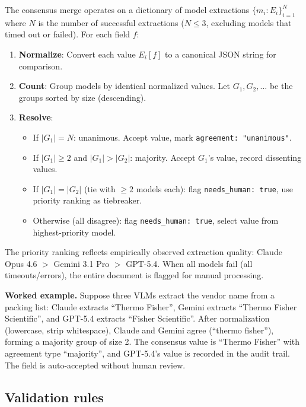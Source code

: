 \documentclass[11pt]{article}
\begin{document}
The consensus merge operates on a dictionary of model extractions
$\{m_i: E_i\}_{i=1}^{N}$ where $N$ is the number of successful
extractions ($N \leq 3$, excluding models that timed out or failed).
For each field $f$:

\begin{enumerate}
  \item \textbf{Normalize}: Convert each value $E_i[f]$ to a canonical
    JSON string for comparison.
  \item \textbf{Count}: Group models by identical normalized values.
    Let $G_1, G_2, \ldots$ be the groups sorted by size (descending).
  \item \textbf{Resolve}:
    \begin{itemize}
      \item If $|G_1| = N$: unanimous. Accept value, mark
        \texttt{agreement: "unanimous"}.
      \item If $|G_1| \geq 2$ and $|G_1| > |G_2|$: majority. Accept
        $G_1$'s value, record dissenting values.
      \item If $|G_1| = |G_2|$ (tie with $\geq 2$ models each): flag
        \texttt{needs\_human: true}, use priority ranking as tiebreaker.
      \item Otherwise (all disagree): flag \texttt{needs\_human: true},
        select value from highest-priority model.
    \end{itemize}
\end{enumerate}

The priority ranking reflects empirically observed extraction quality:
Claude Opus 4.6 $>$ Gemini 3.1 Pro $>$ GPT-5.4. When all models fail
(all timeouts/errors), the entire document is flagged for manual
processing.

\textbf{Worked example.} Suppose three VLMs extract the vendor name
from a packing list: Claude extracts ``Thermo Fisher'', Gemini extracts
``Thermo Fisher Scientific'', and GPT-5.4 extracts ``Fisher Scientific''.
After normalization (lowercase, strip whitespace), Claude and Gemini agree
(``thermo fisher''), forming a majority group of size 2. The consensus
value is ``Thermo Fisher'' with agreement type ``majority'', and GPT-5.4's
value is recorded in the audit trail. The field is auto-accepted
without human review.

\subsection{Validation rules}
\end{document}

